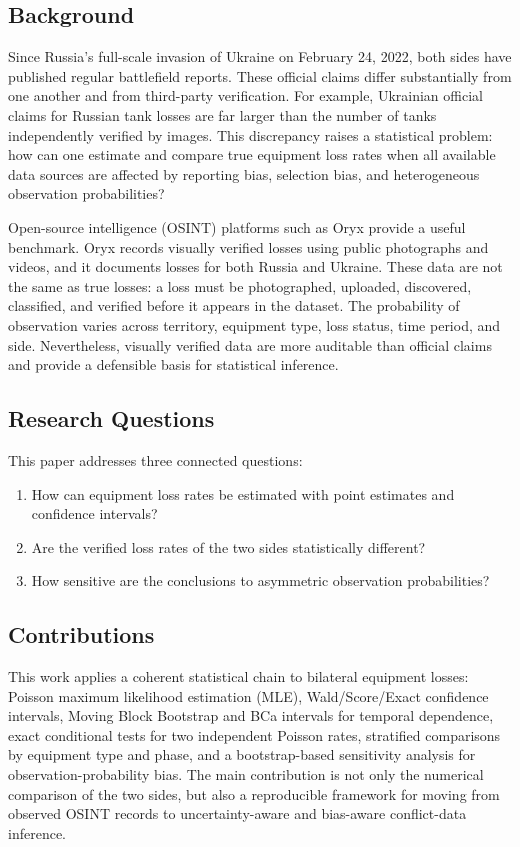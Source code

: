 \documentclass[a4paper,11pt]{article}
\begin{document}
\subsection{Background}

Since Russia's full-scale invasion of Ukraine on February 24, 2022, both sides have published regular battlefield reports. These official claims differ substantially from one another and from third-party verification. For example, Ukrainian official claims for Russian tank losses are far larger than the number of tanks independently verified by images. This discrepancy raises a statistical problem: how can one estimate and compare true equipment loss rates when all available data sources are affected by reporting bias, selection bias, and heterogeneous observation probabilities?

Open-source intelligence (OSINT) platforms such as Oryx provide a useful benchmark. Oryx records visually verified losses using public photographs and videos, and it documents losses for both Russia and Ukraine. These data are not the same as true losses: a loss must be photographed, uploaded, discovered, classified, and verified before it appears in the dataset. The probability of observation varies across territory, equipment type, loss status, time period, and side. Nevertheless, visually verified data are more auditable than official claims and provide a defensible basis for statistical inference.

\subsection{Research Questions}

This paper addresses three connected questions:

\begin{enumerate}
  \item How can equipment loss rates be estimated with point estimates and confidence intervals?
  \item Are the verified loss rates of the two sides statistically different?
  \item How sensitive are the conclusions to asymmetric observation probabilities?
\end{enumerate}

\subsection{Contributions}

This work applies a coherent statistical chain to bilateral equipment losses: Poisson maximum likelihood estimation (MLE), Wald/Score/Exact confidence intervals, Moving Block Bootstrap and BCa intervals for temporal dependence, exact conditional tests for two independent Poisson rates, stratified comparisons by equipment type and phase, and a bootstrap-based sensitivity analysis for observation-probability bias. The main contribution is not only the numerical comparison of the two sides, but also a reproducible framework for moving from observed OSINT records to uncertainty-aware and bias-aware conflict-data inference.
\end{document}
